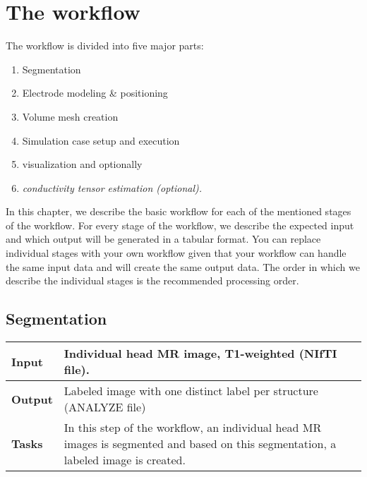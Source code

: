 \newcommand{\bit}[1]{\textit{\textbf{#1}}}

\section{The workflow}
The workflow is divided into five major parts:
\begin{enumerate}
    \item Segmentation
    \item Electrode modeling \& positioning
    \item Volume mesh creation
    \item Simulation case setup and execution
    \item visualization and optionally
    \item \it{conductivity tensor estimation (optional)}.
\end{enumerate}
In this chapter, we describe the basic workflow for each of the mentioned stages of the workflow. For every stage of
the workflow, we describe the expected input and which output will be generated in a tabular format. You can replace
individual stages with your own workflow given that your workflow can handle the same input data and will create the
same output data. The order in which we describe the individual stages is the recommended processing order.

\subsection{Segmentation}
\begin{tabular}{ | p{} || p{} | }
    \hline
    \textbf{Input}  & Individual head MR image, T1-weighted (NIfTI file).\\
    \hline
    \textbf{Output} & Labeled image with one distinct label per structure (ANALYZE file) \\ 
    \hline
    \textbf{Tasks} & In this step of the workflow, an individual head MR images is segmented and based on
                     this segmentation, a labeled image is created. \\
    \hline
\end{tabular}

\hspace{0.5cm}

